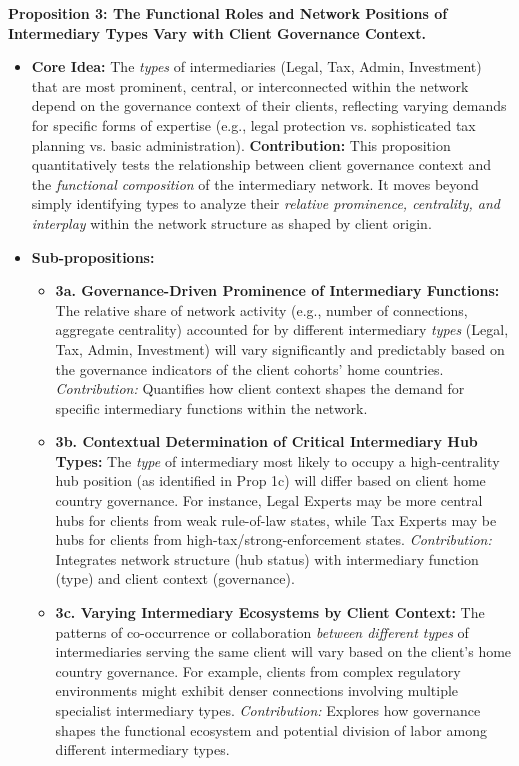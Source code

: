 \textbf{Proposition 3: The Functional Roles and Network Positions of Intermediary Types Vary with Client Governance Context.}
\begin{itemize}[leftmargin=*]
    \item \textbf{Core Idea:} The \textit{types} of intermediaries (Legal, Tax, Admin, Investment) that are most prominent, central, or interconnected within the network depend on the governance context of their clients, reflecting varying demands for specific forms of expertise (e.g., legal protection vs. sophisticated tax planning vs. basic administration).
    \textbf{Contribution:} This proposition quantitatively tests the relationship between client governance context and the \textit{functional composition} of the intermediary network. It moves beyond simply identifying types to analyze their \textit{relative prominence, centrality, and interplay} within the network structure as shaped by client origin.
    \item \textbf{Sub-propositions:}
    \begin{itemize}[leftmargin=\parindent]
        \item \textbf{3a. Governance-Driven Prominence of Intermediary Functions:} The relative share of network activity (e.g., number of connections, aggregate centrality) accounted for by different intermediary \textit{types} (Legal, Tax, Admin, Investment) will vary significantly and predictably based on the governance indicators of the client cohorts' home countries. \textit{Contribution:} Quantifies how client context shapes the demand for specific intermediary functions within the network.
        \item \textbf{3b. Contextual Determination of Critical Intermediary Hub Types:} The \textit{type} of intermediary most likely to occupy a high-centrality hub position (as identified in Prop 1c) will differ based on client home country governance. For instance, Legal Experts may be more central hubs for clients from weak rule-of-law states, while Tax Experts may be hubs for clients from high-tax/strong-enforcement states. \textit{Contribution:} Integrates network structure (hub status) with intermediary function (type) and client context (governance).
        \item \textbf{3c. Varying Intermediary Ecosystems by Client Context:} The patterns of co-occurrence or collaboration \textit{between different types} of intermediaries serving the same client will vary based on the client's home country governance. For example, clients from complex regulatory environments might exhibit denser connections involving multiple specialist intermediary types. \textit{Contribution:} Explores how governance shapes the functional ecosystem and potential division of labor among different intermediary types.
    \end{itemize}
\end{itemize}

